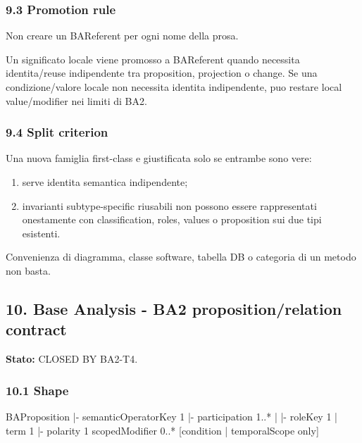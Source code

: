 \documentclass[
  9pt,
  a4paper,
]{article}
\newenvironment{Shaded}{}{}
\newcommand{\NormalTok}[1]{#1}
\providecommand{\tightlist}{%
  \setlength{\itemsep}{0pt}\setlength{\parskip}{0pt}}
\begin{document}
\subsubsection{9.3 Promotion rule}\label{promotion-rule}

Non creare un BAReferent per ogni nome della prosa.

Un significato locale viene promosso a BAReferent quando necessita
identita/reuse indipendente tra proposition, projection o change. Se una
condizione/valore locale non necessita identita indipendente, puo
restare local value/modifier nei limiti di BA2.

\subsubsection{9.4 Split criterion}\label{split-criterion}

Una nuova famiglia first-class e giustificata solo se entrambe sono
vere:

\begin{enumerate}
\def\labelenumi{\arabic{enumi}.}
\tightlist
\item
  serve identita semantica indipendente;
\item
  invarianti subtype-specific riusabili non possono essere rappresentati
  onestamente con classification, roles, values o proposition sui due
  tipi esistenti.
\end{enumerate}

Convenienza di diagramma, classe software, tabella DB o categoria di un
metodo non basta.

\subsection{10. Base Analysis - BA2 proposition/relation
contract}\label{base-analysis---ba2-propositionrelation-contract}

\textbf{Stato:} CLOSED BY BA2-T4.

\subsubsection{10.1 Shape}\label{shape}

\begin{Shaded}
\begin{Highlighting}[]
\NormalTok{BAProposition}
\NormalTok{|{-} semanticOperatorKey   1}
\NormalTok{|{-} participation         1..*}
\NormalTok{|    |{-} roleKey          1}
\NormalTok{|    \textasciigrave{}{-} term             1}
\NormalTok{|{-} polarity              1}
\NormalTok{\textasciigrave{}{-} scopedModifier        0..* [condition | temporalScope only]}
\end{Highlighting}
\end{Shaded}
\end{document}
